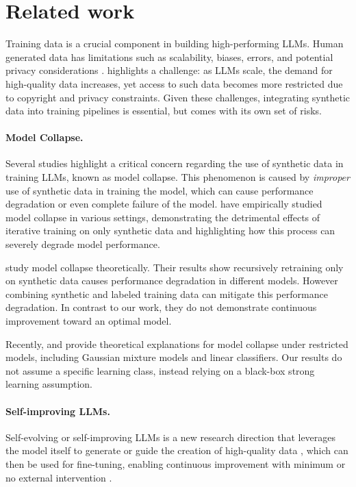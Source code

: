 \section{Related work}
Training data is a crucial component in building high-performing LLMs. %
Human generated data has limitations such as scalability, biases, errors, and potential privacy considerations  \citep{kurakin2023harnessing,singh2024beyond,gilardi2023chatgpt,long-etal-2024-llms}. \citet{longpre2024consent} highlights a challenge: as LLMs scale, the demand for high-quality data increases, yet access to such data becomes more restricted due to copyright and privacy constraints. Given these challenges, integrating synthetic data into training pipelines is essential, but comes with its own set of risks. %

\paragraph{Model Collapse.} Several studies highlight a critical concern regarding the use of synthetic data in training LLMs, known as model collapse. This phenomenon is caused by \textit{improper} use of synthetic data in training the model, which can cause performance degradation or even complete failure of the model. \citet{alemohammad2024selfconsuming,shumailov2024ai,Hataya_2023_ICCV,gerstgrasser2024is} have empirically studied model collapse in various settings, demonstrating the detrimental effects of iterative training on only synthetic data and highlighting how this process can severely degrade model performance.

\citet{dohmatob2024model,pmlr-v235-dohmatob24b,bertrand2024on,dey2024universality,seddik2024how} study model collapse theoretically. Their results show recursively retraining only on synthetic data causes performance degradation in different models. However combining synthetic and labeled training data \citep{bertrand2024on,dey2024universality,seddik2024how} can mitigate this performance degradation. In contrast to our work, they do not demonstrate continuous improvement toward an optimal model.  

Recently, \citet{suresh2024rate} and \citet{feng2024beyond} provide theoretical explanations for model collapse under restricted models, including Gaussian mixture models and linear classifiers. Our results do not assume a specific learning class, instead relying on a black-box strong learning assumption. 


\paragraph{Self-improving LLMs.} Self-evolving or self-improving LLMs \citep{tao2024survey} is a new research direction that leverages the model itself to generate or guide the creation of high-quality data \citep{wang-etal-2023-self-instruct,huang-etal-2023-large}, which can then be used for fine-tuning, enabling continuous improvement with minimum or no external intervention \citep{pmlr-v235-yuan24d,pmlr-v235-chen24j}.

